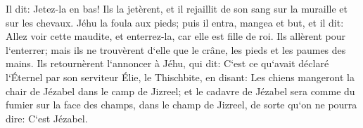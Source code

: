 \verse Il dit: Jetez-la en bas! Ils la jetèrent, et il rejaillit de son sang sur la muraille et sur les chevaux. Jéhu la foula aux pieds; 
\verse puis il entra, mangea et but, et il dit: Allez voir cette maudite, et enterrez-la, car elle est fille de roi. 
\verse Ils allèrent pour l`enterrer; mais ils ne trouvèrent d`elle que le crâne, les pieds et les paumes des mains. 
\verse Ils retournèrent l`annoncer à Jéhu, qui dit: C`est ce qu`avait déclaré l`Éternel par son serviteur Élie, le Thischbite, en disant: Les chiens mangeront la chair de Jézabel dans le camp de Jizreel; 
\verse et le cadavre de Jézabel sera comme du fumier sur la face des champs, dans le champ de Jizreel, de sorte qu`on ne pourra dire: C`est Jézabel. 

\chapter{}

